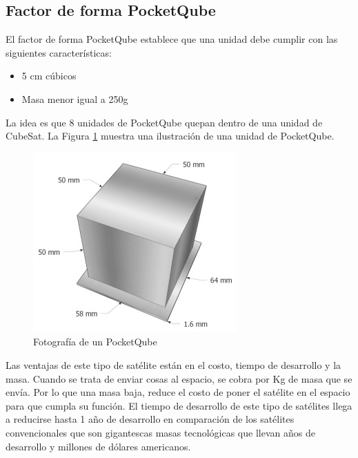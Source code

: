 \documentclass{article}%
\begin{document}
\subsection{Factor de forma PocketQube}
\justify
El factor de forma PocketQube establece que una unidad debe cumplir con las siguientes 
características:
\begin{itemize}
  \item 5 cm cúbicos
  \item Masa menor igual a 250g
\end{itemize}
\justify
La idea es que 8 unidades de PocketQube quepan dentro de una unidad de CubeSat. La Figura \ref{fig:pq} 
muestra una ilustración de una unidad de PocketQube.
\begin{figure}[!h]
  \centering
  \includegraphics[width=0.5\linewidth]{img/1UPocketQube.jpg}
  \caption{Fotografía de un PocketQube}
  \label{fig:pq}
\end{figure}
\justify
Las ventajas de este tipo de satélite están en el costo, tiempo de desarrollo y la masa. Cuando 
se trata de enviar cosas al espacio, se cobra por Kg de masa que se envía. Por lo que una masa 
baja, reduce el costo de poner el satélite en el espacio para que cumpla su función. El tiempo 
de desarrollo de este tipo de satélites llega a reducirse hasta 1 año de desarrollo en comparación 
de los satélites convencionales que son gigantescas masas tecnológicas que llevan años de desarrollo 
y millones de dólares americanos. 
\end{document}
